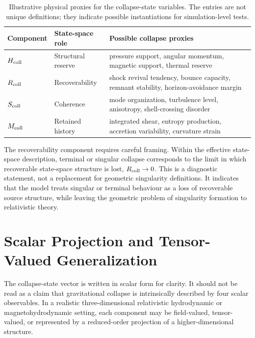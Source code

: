 \documentclass[11pt]{article}
\begin{document}
\begin{table}[t]
\centering
\caption{Illustrative physical proxies for the collapse-state variables. The entries are not unique definitions; they indicate possible instantiations for simulation-level tests.}
\begin{tabular}{lll}
\toprule
Component & State-space role & Possible collapse proxies \\
\midrule
\(H_{\rm coll}\) & Structural reserve & pressure support, angular momentum, magnetic support, thermal reserve \\
\(R_{\rm coll}\) & Recoverability & shock revival tendency, bounce capacity, remnant stability, horizon-avoidance margin \\
\(S_{\rm coll}\) & Coherence & mode organization, turbulence level, anisotropy, shell-crossing disorder \\
\(M_{\rm coll}\) & Retained history & integrated shear, entropy production, accretion variability, curvature strain \\
\bottomrule
\end{tabular}
\label{tab:collapse_proxies}
\end{table}

The recoverability component requires careful framing. Within the effective state-space description, terminal or singular collapse corresponds to the limit in which recoverable state-space structure is lost, \(R_{\rm coll}\to0\). This is a diagnostic statement, not a replacement for geometric singularity definitions. It indicates that the model treats singular or terminal behaviour as a loss of recoverable source structure, while leaving the geometric problem of singularity formation to relativistic theory.

\section{Scalar Projection and Tensor-Valued Generalization}
\label{sec:tensor_generalization}

The collapse-state vector is written in scalar form for clarity. It should not be read as a claim that gravitational collapse is intrinsically described by four scalar observables. In a realistic three-dimensional relativistic hydrodynamic or magnetohydrodynamic setting, each component may be field-valued, tensor-valued, or represented by a reduced-order projection of a higher-dimensional structure.
\end{document}
